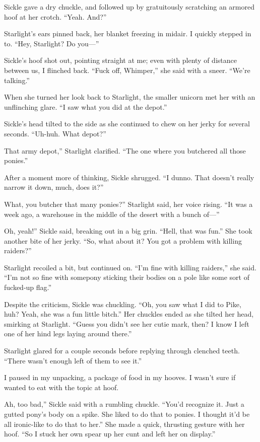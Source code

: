 Sickle gave a dry chuckle, and followed up by gratuitously scratching an armored hoof at her crotch. “Yeah. And?”

Starlight’s ears pinned back, her blanket freezing in midair. I quickly stepped in to. “Hey, Starlight? Do you—”

Sickle’s hoof shot out, pointing straight at me; even with plenty of distance between us, I flinched back. “Fuck off, Whimper,” she said with a sneer. “We’re talking.”

When she turned her look back to Starlight, the smaller unicorn met her with an unflinching glare. “I saw what you did at the depot.”

Sickle’s head tilted to the side as she continued to chew on her jerky for several seconds. “Uh-huh. What depot?”

\leavevmode{}That army depot,” Starlight clarified. “The one where you butchered all those ponies.”

After a moment more of thinking, Sickle shrugged. “I dunno. That doesn’t really narrow it down, much, does it?”

\leavevmode{}What, you butcher that many ponies?” Starlight said, her voice rising. “It was a week ago, a warehouse in the middle of the desert with a bunch of—”

\leavevmode{}Oh, yeah!” Sickle said, breaking out in a big grin. “Hell, that was fun.” She took another bite of her jerky. “So, what about it? You got a problem with killing raiders?”

Starlight recoiled a bit, but continued on. “I’m fine with killing raiders,” she said. “I’m not so fine with somepony sticking their bodies on a pole like some sort of fucked-up flag.”

Despite the criticism, Sickle was chuckling. “Oh, you saw what I did to Pike, huh? Yeah, she was a fun little bitch.” Her chuckles ended as she tilted her head, smirking at Starlight. “Guess you didn’t see her cutie mark, then? I know I left one of her hind legs laying around there.”

Starlight glared for a couple seconds before replying through clenched teeth. “There wasn’t enough left of them to see it.”

I paused in my unpacking, a package of food in my hooves. I wasn’t sure if wanted to eat with the topic at hoof.

\leavevmode{}Ah, too bad,” Sickle said with a rumbling chuckle. “You’d recognize it. Just a gutted pony’s body on a spike. She liked to do that to ponies. I thought it’d be all ironic-like to do that to her.” She made a quick, thrusting gesture with her hoof. “So I stuck her own spear up her cunt and left her on display.”


